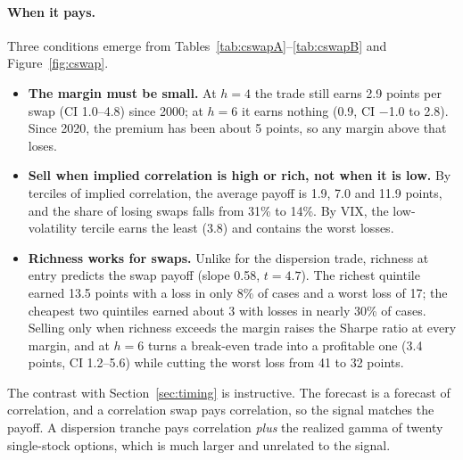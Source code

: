\paragraph{When it pays.} Three conditions emerge from Tables~\ref{tab:cswapA}--\ref{tab:cswapB} and Figure~\ref{fig:cswap}.
\begin{itemize}
  \item \textbf{The margin must be small.} At $h = 4$ the trade still earns 2.9 points per swap (CI 1.0--4.8) since 2000; at $h = 6$ it earns nothing (0.9, CI $-$1.0 to 2.8). Since 2020, the premium has been about 5 points, so any margin above that loses.
  \item \textbf{Sell when implied correlation is high or rich, not when it is low.} By terciles of implied correlation, the average payoff is 1.9, 7.0 and 11.9 points, and the share of losing swaps falls from 31\% to 14\%. By VIX, the low-volatility tercile earns the least (3.8) and contains the worst losses.
  \item \textbf{Richness works for swaps.} Unlike for the dispersion trade, richness at entry predicts the swap payoff (slope 0.58, $t = 4.7$). The richest quintile earned 13.5 points with a loss in only 8\% of cases and a worst loss of 17; the cheapest two quintiles earned about 3 with losses in nearly 30\% of cases. Selling only when richness exceeds the margin raises the Sharpe ratio at every margin, and at $h = 6$ turns a break-even trade into a profitable one (3.4 points, CI 1.2--5.6) while cutting the worst loss from 41 to 32 points.
\end{itemize}
The contrast with Section~\ref{sec:timing} is instructive. The forecast is a forecast of correlation, and a correlation swap pays correlation, so the signal matches the payoff. A dispersion tranche pays correlation \emph{plus} the realized gamma of twenty single-stock options, which is much larger and unrelated to the signal.

